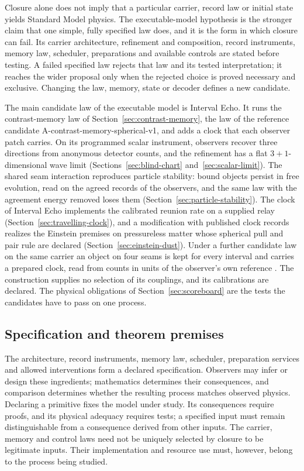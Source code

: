 \documentclass[11pt]{article}
\theoremstyle{definition}
\theoremstyle{remark}
\begin{document}
Closure alone does not imply that a particular carrier, record law or initial
state yields Standard Model physics. The executable-model hypothesis is the
stronger claim that one simple, fully specified law does, and it is the form
in which closure can fail. Its carrier architecture, refinement and
composition, record instruments, memory law, scheduler, preparations and
available controls are stated before testing. A failed specified law
rejects that law and its tested interpretation; it reaches the wider
proposal only when the rejected choice is proved necessary and exclusive.
Changing the law, memory, state or decoder defines a new candidate.

The main candidate law of the executable model is Interval Echo. It runs
the contrast-memory law of Section~\ref{sec:contrast-memory}, the law of the
reference candidate A-contrast-memory-spherical-v1, and adds a clock that
each observer patch carries. On its programmed scalar instrument,
observers recover three directions from anonymous detector counts, and
the refinement has a flat $3{+}1$-dimensional wave limit
(Sections~\ref{sec:blind-chart} and~\ref{sec:scalar-limit}). The shared
seam interaction reproduces particle stability: bound objects persist in
free evolution, read on the agreed records of the observers, and the same
law with the agreement energy removed loses them
(Section~\ref{sec:particle-stability}). The clock of Interval Echo
implements the calibrated reunion rate on a supplied relay
(Section~\ref{sec:travelling-clock}), and a modification with published
clock records realizes the Einstein premises on pressureless matter
whose spherical pull and pair rule are declared
(Section~\ref{sec:einstein-dust}). Under a further candidate law on the same carrier an object on four seams is kept
for every interval and carries a prepared clock, read from counts in units
of the observer's own reference \cite{ophmodel}. The construction supplies
no selection of its couplings, and its calibrations are declared. The
physical obligations of Section~\ref{sec:scoreboard} are the
tests the candidates have to pass on one process.

\subsection{Specification and theorem premises}
\label{sec:specification-premises}

The architecture, record instruments, memory law, scheduler, preparation
services and allowed interventions form a declared specification. Observers
may infer or design these ingredients; mathematics determines their
consequences, and comparison determines whether the resulting process
matches observed physics. Declaring a primitive fixes the model under
study. Its consequences require proofs, and its physical adequacy
requires tests; a specified input must remain distinguishable from a
consequence derived from other inputs. The carrier, memory and control laws need not be uniquely
selected by closure to be legitimate inputs. Their implementation and
resource use must, however, belong to the process being studied.
\end{document}

